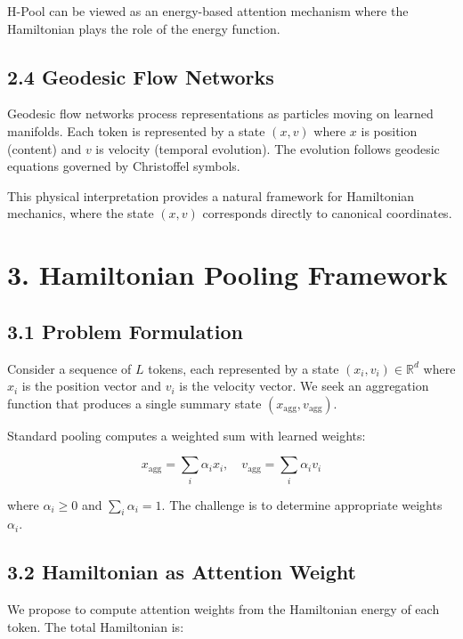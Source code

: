 \documentclass[12pt]{article}
\begin{document}
H-Pool can be viewed as an energy-based attention mechanism where the Hamiltonian plays the role of the energy function.

\subsection{2.4 Geodesic Flow Networks}

Geodesic flow networks process representations as particles moving on learned manifolds. Each token is represented by a state $(x, v)$ where $x$ is position (content) and $v$ is velocity (temporal evolution). The evolution follows geodesic equations governed by Christoffel symbols.

This physical interpretation provides a natural framework for Hamiltonian mechanics, where the state $(x, v)$ corresponds directly to canonical coordinates.

\section{3. Hamiltonian Pooling Framework}

\subsection{3.1 Problem Formulation}

Consider a sequence of $L$ tokens, each represented by a state $(x_i, v_i) \in \mathbb{R}^d$ where $x_i$ is the position vector and $v_i$ is the velocity vector. We seek an aggregation function that produces a single summary state $(x_{\text{agg}}, v_{\text{agg}})$.

Standard pooling computes a weighted sum with learned weights:

\begin{equation}
x_{\text{agg}} = \sum_i \alpha_i x_i, \quad v_{\text{agg}} = \sum_i \alpha_i v_i
\end{equation}

where $\alpha_i \geq 0$ and $\sum_i \alpha_i = 1$. The challenge is to determine appropriate weights $\alpha_i$.

\subsection{3.2 Hamiltonian as Attention Weight}

We propose to compute attention weights from the Hamiltonian energy of each token. The total Hamiltonian is:
\end{document}
